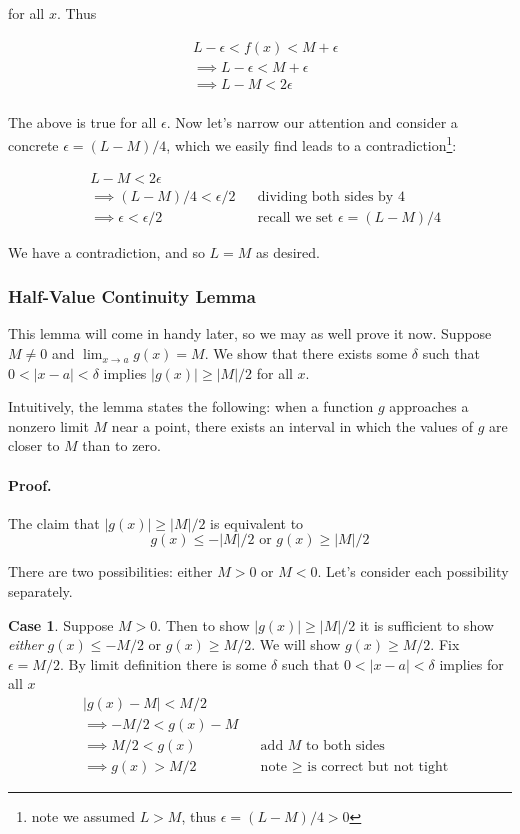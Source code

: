 for all $x$. Thus

\begin{align*}
    &L-\epsilon<f(x)<M+\epsilon\\
    &\implies L-\epsilon<M+\epsilon\\
    &\implies L-M<2\epsilon\\
\end{align*}

The above is true for all $\epsilon$. Now let's narrow our attention and
consider a concrete $\epsilon=(L-M)/4$, which we easily find leads to a
contradiction\footnote{note we assumed $L>M$, thus $\epsilon=(L-M)/4>0$}:

\begin{align*}
    &L-M<2\epsilon\\
    &\implies (L-M)/4<\epsilon/2&&\text{dividing both sides by 4}\\
    &\implies \epsilon<\epsilon/2&&\text{recall we set $\epsilon=(L-M)/4$}
\end{align*}

We have a contradiction, and so $L=M$ as desired.

\subsubsection*{Half-Value Continuity Lemma} \label{subsubsec:half-value-lemma}

This lemma will come in handy later, so we may as well prove it now.
Suppose $M\neq0$ and $\lim_{x\to a}g(x)=M$. We show that there exists some
$\delta$ such that $0<|x-a|<\delta$ implies $|g(x)|\geq|M|/2$ for all $x$.

\vs

Intuitively, the lemma states the following: when a function $g$
approaches a nonzero limit $M$ near a point, there exists an interval
in which the values of $g$ are closer to $M$ than to zero.

\paragraph{Proof.} The claim that $|g(x)|\geq|M|/2$ is equivalent to
\[g(x)\leq-|M|/2 \text{\ \ \ or\ \ \ }g(x)\geq|M|/2\]

There are two possibilities: either $M>0$ or $M<0$. Let's consider
each possibility separately.

\vs

\textbf{Case 1}. Suppose $M>0$. Then to show $|g(x)|\geq|M|/2$ it is
sufficient to show \textit{either} $g(x)\leq-M/2$ or $g(x)\geq M/2$. We will
show $g(x)\geq M/2$. Fix $\epsilon=M/2$. By limit definition there is some
$\delta$ such that $0<|x-a|<\delta$ implies for all $x$
\begin{align*}
    &|g(x)-M|<M/2\\
    &\implies -M/2<g(x)-M\\
    &\implies M/2<g(x)&&\text{add $M$ to both sides}\\
    &\implies g(x)>M/2&&\text{note $\geq$ is correct but not tight}
\end{align*}

